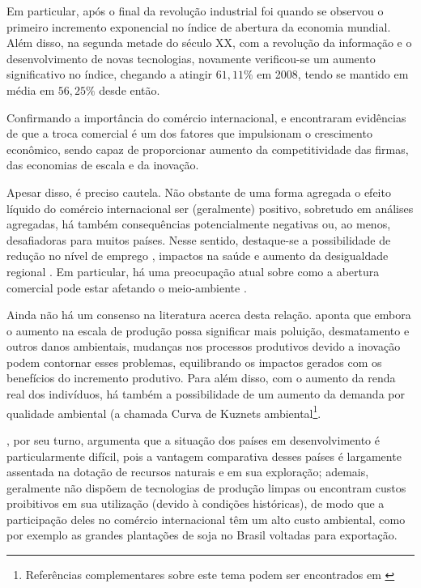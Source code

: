 \documentclass[12pt,
               openright,
               oneside,
               a4paper,
							 section=TITLE,     %
               subsection=Title,  %
               english,brazil]{article}
\begin{document}
Em particular, após o final da revolução industrial foi quando se observou o primeiro incremento exponencial no índice de abertura da economia mundial. Além disso, na segunda metade do século XX, com a revolução da informação e o desenvolvimento de novas tecnologias, novamente verificou-se um aumento significativo no índice, chegando a atingir $61,11\%$ em 2008, tendo se mantido em média em $56,25\%$ desde então. 

Confirmando a importância do comércio internacional,  e  encontraram evidências de que a troca comercial é um dos fatores que impulsionam o crescimento econômico, sendo capaz de proporcionar aumento da competitividade das firmas, das economias de escala e da inovação. 

Apesar disso, é preciso cautela. Não obstante de uma forma agregada o efeito líquido do comércio internacional ser (geralmente) positivo, sobretudo em análises agregadas, há também consequências potencialmente negativas ou, ao menos, desafiadoras para muitos países. Nesse sentido, destaque-se a possibilidade de redução no nível de emprego \cite{Tuhin2015}, impactos na saúde \cite{Smith2015} e aumento da desigualdade regional \cite{Daumal2010, Pavcnik2017}. Em particular, há uma preocupação atual sobre como a abertura comercial pode estar afetando o meio-ambiente \cite{Frankel2008, Williams1993}.

Ainda não há um consenso na literatura acerca desta relação.  aponta que embora o aumento na escala de produção possa significar mais poluição, desmatamento e outros danos ambientais, mudanças nos processos produtivos devido a inovação podem contornar esses problemas, equilibrando os impactos gerados com os benefícios do incremento produtivo. Para além disso, com o aumento da renda real dos indivíduos, há também a possibilidade de um aumento da demanda por qualidade ambiental (a chamada Curva de Kuznets ambiental\footnote{Referências complementares sobre este tema podem ser encontrados em \cite{Stern2004, Carvalho2010, Carvalho2013}}. 

, por seu turno, argumenta que a situação dos países em desenvolvimento é particularmente difícil, pois a vantagem comparativa desses países é largamente assentada na dotação de recursos naturais e em sua exploração; ademais, geralmente não dispõem de tecnologias de produção limpas ou encontram custos proibitivos em sua utilização (devido à condições históricas), de modo que a participação deles no comércio internacional têm um alto custo ambiental, como por exemplo as grandes plantações de soja no Brasil voltadas para exportação.
\end{document}
